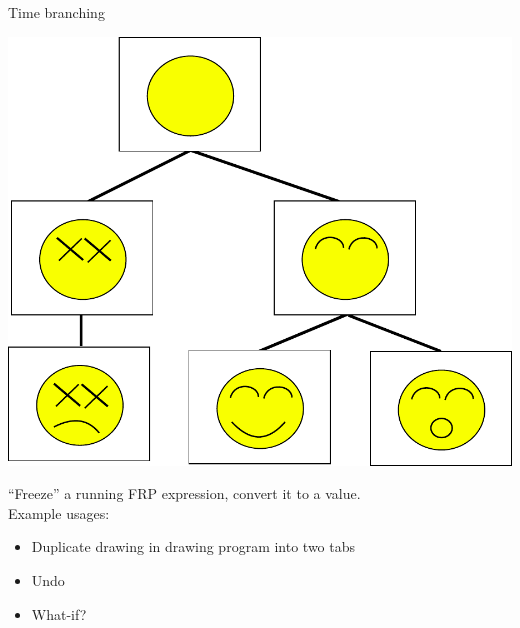 \documentclass{beamer}
\begin{document}
\begin{frame}{Time branching}
\vspace{-0.2cm}
\begin{center}
\includegraphics[scale=0.4]{drawing.pdf}\\
\end{center}
\vspace{-0.2cm}
\noindent``Freeze'' a running FRP expression, convert it to a value.\\

Example usages:
\begin{itemize}
\item Duplicate drawing in drawing program into two tabs
\item Undo
\item What-if?
\end{itemize}


\end{frame}
\end{document}

